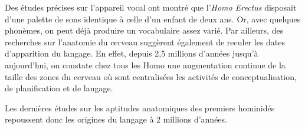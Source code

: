 Des études précises sur l’appareil vocal ont montré que l’\textit{Homo Erectus} disposait d’une palette de sons identique à celle d’un enfant de deux ans. Or, avec quelques phonèmes, on peut déjà produire un vocabulaire assez varié. Par ailleurs, des recherches sur l’anatomie du cerveau suggèrent également de reculer les dates d’apparition du langage. En effet, depuis 2,5 millions d’années jusqu’à aujourd’hui, on constate chez tous les Homo une augmentation continue de la taille des zones du cerveau où sont centralisées les activités de conceptualisation, de planification et de langage.

Les dernières études sur les aptitudes anatomiques des premiers hominidés repoussent donc les origines du langage à 2 millions d’années.

